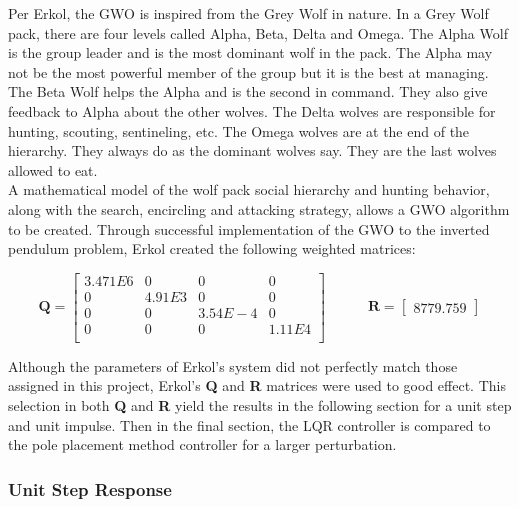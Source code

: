 \documentclass[titlepage]{article}
\begin{document}
Per Erkol, the GWO is inspired from the Grey Wolf in nature. In a Grey Wolf pack, there are four levels called Alpha, Beta, Delta and Omega. The Alpha Wolf is the group leader and is the most dominant wolf in the pack. The Alpha may not be the most powerful member of the group but it is the best at managing. The Beta Wolf helps the Alpha and is the second in command. They also give feedback to Alpha about the other wolves. The Delta wolves are responsible for hunting, scouting, sentineling, etc. The Omega wolves are at the end of the hierarchy. They always do as the dominant wolves say. They are the last wolves allowed to eat.\\

A mathematical model of the wolf pack social hierarchy and hunting behavior, along with the search, encircling and attacking strategy, allows a GWO algorithm to be created. Through successful implementation of the GWO to the inverted pendulum problem, Erkol created the following weighted matrices:

\begin{equation}
		\textbf{Q}=\begin{bmatrix}
			3.471E6 & 0 & 0 & 0\\
			0 & 4.91E3 & 0 & 0\\
			0 & 0 & 3.54E-4 & 0\\
			0 & 0 & 0 & 1.11E4\\
		\end{bmatrix}
		\quad\quad\quad\textbf{R} =
		\begin{bmatrix}
			8779.759
		\end{bmatrix}
\end{equation}

Although the parameters of Erkol’s system did not perfectly match those assigned in this project, Erkol’s \textbf{Q} and \textbf{R} matrices were used to good effect. This selection in both \textbf{Q} and \textbf{R} yield the results in the following section for a unit step and unit impulse. Then in the final section, the LQR controller is compared to the pole placement method controller for a larger perturbation.

\subsubsection{Unit Step Response}
\end{document}
